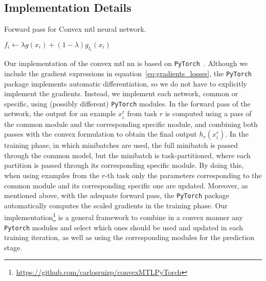 \subsection{Implementation Details}
\begin{algorithm}[!t]
    
    \caption{Forward pass for Convex \acrshort{mtl} neural network.}
    \label{alg:forward}
    \DontPrintSemicolon
      
            { 
                $f_i \gets \lambda g(x_i) + (1 - \lambda) g_{t_i}(x_i)$   

            }
\end{algorithm}

Our implementation of the convex \acrshort{mtl} \acrshort{nn} is based on \texttt{PyTorch}~\citep{PyTorch}.
Although we include the gradient expressions in equation~\eqref{eq:gradients_losses}, the \texttt{PyTorch} package implements automatic differentiation, so we do not have to explicitly implement the gradients.
Instead, we implement each network, common or specific, using (possibly different) \texttt{PyTorch} modules.
In the forward pass of the network, the output for an example $x_i^r$ from task $r$ is computed using a pass of the common module and the corresponding specific module, and combining both passes with the convex formulation to obtain the final output $h_r(x_i^r)$.
In the training phase, in which minibatches are used, the full minibatch is passed through the common model, but the minibatch is task-partitioned, where each partition is passed through its corresponding specific module.
By doing this, when using examples from the $r$-th task only the parameters corresponding to the common module and its corresponding specific one are updated.
Moreover, as mentioned above, with the adequate forward pass, the \texttt{PyTorch} package automatically computes the scaled gradients in the training phase.
Our implementation\footnote{\url{https://github.com/carlosruizp/convexMTLPyTorch}} is a general framework to combine in a convex manner any \texttt{Pytorch} modules and select which ones should be used and updated in each training iteration, as well as using the corresponding modules for the prediction stage.


